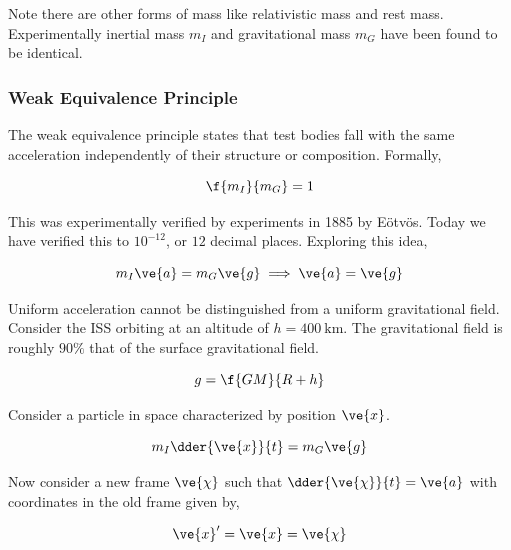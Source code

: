 \documentclass{article}
\begin{document}
Note there are other forms of mass like relativistic mass and rest mass. \\

Experimentally inertial mass $m_I$ and gravitational mass $m_G$ have been found to be identical.

\subsubsection{Weak Equivalence Principle}

The weak equivalence principle states that test bodies fall with the same acceleration independently of their structure or composition. Formally,

\[ \f{m_I}{m_G} = 1 \]

This was experimentally verified by experiments in 1885 by Eötvös. Today we have verified this to $10^{-12}$, or $12$ decimal places. Exploring this idea,

\[ m_I \ve{a} = m_G \ve{g} \implies \ve{a} = \ve{g} \]

Uniform acceleration cannot be distinguished from a uniform gravitational field. \\

Consider the ISS orbiting at an altitude of $h = \SI{400}{\km}$. The gravitational field is roughly $90\%$ that of the surface gravitational field.

\[ g = \f{GM}{R+h} \]

Consider a particle in space characterized by position $\ve{x}$.

\[ m_I \dder{\ve{x}}{t} = m_G \ve{g} \]

Now consider a new frame $\ve{\chi}$ such that $\dder{\ve{\chi}}{t} = \ve{a}$ with coordinates in the old frame given by,

\[ \ve{x}' = \ve{x} = \ve{\chi} \]


\begin{center}
\end{center}
\end{document}
